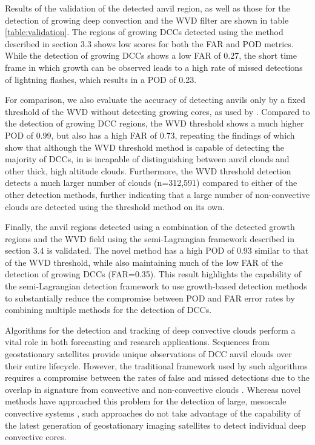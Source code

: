 \documentclass[amt, manuscript]{copernicus}
\begin{document}
Results of the validation of the detected anvil region, as well as those for the detection of growing deep convection and the WVD filter are shown in table \ref{table:validation}.
The regions of growing DCCs detected using the method described in section 3.3 shows low scores for both the FAR and POD metrics.
While the detection of growing DCCs shows a low FAR of 0.27, the short time frame in which growth can be observed leads to a high rate of missed detections of lightning flashes, which results in a POD of 0.23.

For comparison, we also evaluate the accuracy of detecting anvils only by a fixed threshold of the WVD without detecting growing cores, as used by \citet{muller_role_2018}.
Compared to the detection of growing DCC regions, the WVD threshold shows a much higher POD of 0.99, but also has a high FAR of 0.73, repeating the findings of \citet{muller_novel_2019} which show that although the WVD threshold method is capable of detecting the majority of DCCs, in is incapable of distinguishing between anvil clouds and other thick, high altitude clouds.
Furthermore, the WVD threshold detection detects a much larger number of clouds (n=312,591) compared to either of the other detection methods, further indicating that a large number of non-convective clouds are detected using the threshold method on its own.

Finally, the anvil regions detected using a combination of the detected growth regions and the WVD field using the semi-Lagrangian framework described in section 3.4 is validated.
The novel method has a high POD of 0.93 similar to that of the WVD threshold, while also maintaining much of the low FAR of the detection of growing DCCs (FAR=0.35).
This result highlights the capability of the semi-Lagrangian detection framework to use growth-based detection methods to substantially reduce the compromise between POD and FAR error rates by combining multiple methods for the detection of DCCs.


\conclusions  %

Algorithms for the detection and tracking of deep convective clouds perform a vital role in both forecasting and research applications.
Sequences from geostationary satellites provide unique observations of DCC anvil clouds over their entire lifecycle.
However, the traditional framework used by such algorithms requires a compromise between the rates of false and missed detections due to the overlap in signature from convective and non-convective clouds \citep{konduru_new_2013}.
Whereas novel methods have approached this problem for the detection of large, mesoscale convective systems \citep{fiolleau_algorithm_2013}, such approaches do not take advantage of the capability of the latest generation of geostationary imaging satellites to detect individual deep convective cores.
\end{document}

